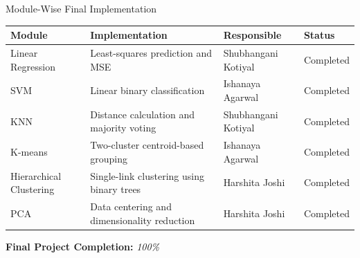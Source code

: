 \documentclass[aspectratio=169,11pt]{beamer}
\newcommand{\placeholder}[1]{%
\textit{\color{GEUGrey}#1}
}
\begin{document}
\begin{frame}{Module-Wise Final Implementation}

\scriptsize

\begin{center}

\renewcommand{\arraystretch}{1.35}

\begin{tabularx}{.90\textwidth}
{@{}p{1.9cm}X p{2.4cm}p{2.4cm}@{}}

\toprule
\textbf{Module} &
\textbf{Implementation} &
\textbf{Responsible} &
\textbf{Status}\\
\midrule

{Linear Regression} &
{Least-squares prediction and MSE} &
{Shubhangani Kotiyal} &
Completed\\

{SVM} &
{Linear binary classification} &
{Ishanaya Agarwal} &
Completed\\

{KNN} &
{Distance calculation and majority voting} &
{Shubhangani Kotiyal} &
Completed\\

{K-means} &
{Two-cluster centroid-based grouping} &
{Ishanaya Agarwal} &
Completed\\

{Hierarchical Clustering} &
{Single-link clustering using binary trees} &
{Harshita Joshi} &
Completed\\

{PCA} &
{Data centering and dimensionality reduction} &
{Harshita Joshi} &
Completed\\

\bottomrule

\end{tabularx}

\end{center}

\vspace{4mm}

\begin{center}
\colorbox{GEULightBlue}{
\parbox{.65\textwidth}{
\centering
\textbf{Final Project Completion:}
\placeholder{100\%}
}}
\end{center}

\vfill

\end{frame}
\end{document}
